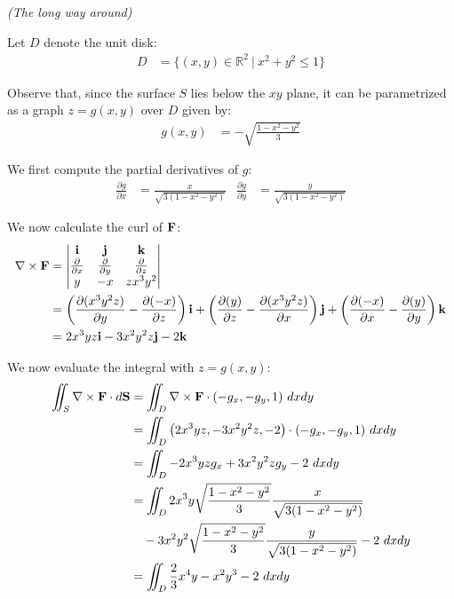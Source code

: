 \begin{solution}
    \textit{(The long way around)}

    Let \(D\) denote the unit disk:
    \begin{align}
        D &= \{(x, y) \in \mathbb{R}^2 \ | \ x^2 + y^2 \leq 1\}
    \end{align}
    
    Observe that, since the surface \(S\) lies below the \(xy\) plane, it can be parametrized as a graph \(z = g(x, y)\) over \(D\) given by:
    \begin{align}
        g(x, y) &= - \sqrt{\frac{1 - x^2 - y^2}{3}}
    \end{align}

    We first compute the partial derivatives of \(g\):
    \begin{align*}
        \frac{\partial g}{\partial x} &= \frac{x}{\sqrt{3(1 - x^2 - y^2)}} & \frac{\partial g}{\partial y} &= \frac{y}{\sqrt{3(1 - x^2 - y^2)}}
    \end{align*}

    We now calculate the curl of \(\vb{F}\):
    \begin{align*}
        \nabla \times \vb{F} &= 
        \begin{vmatrix}
            \vb{i} & \vb{j} & \vb{k} \\
            \frac{\partial}{\partial x} & \frac{\partial}{\partial y} & \frac{\partial}{\partial z} \\
            y & -x & zx^3y^2
        \end{vmatrix} \\
        &= \left(\frac{\partial (x^3y^2z)}{\partial y} - \frac{\partial (-x)}{\partial z}\right)\vb{i} + \left(\frac{\partial (y)}{\partial z} - \frac{\partial (x^3y^2z)}{\partial x}\right)\vb{j} + \left(\frac{\partial (-x)}{\partial x} - \frac{\partial (y)}{\partial y}\right)\vb{k} \\
        &= 2x^3yz\vb{i} - 3x^2y^2z\vb{j} -2\vb{k}
    \end{align*}

    We now evaluate the integral with \(z = g(x, y)\):
    \begin{align*}
        \iint_S \nabla \times \vb{F} \cdot d\vb{S} &= \iint_D \nabla \times \vb{F} \cdot (-g_x, -g_y, 1) \ dxdy \\
        &= \iint_D \left(2x^3yz, - 3x^2y^2z, -2\right) \cdot (-g_x, -g_y, 1) \ dxdy \\
        &= \iint_D -2x^3y z g_x + 3x^2y^2 z g_y -2 \ dxdy \\
        &= \iint_D 2x^3y \sqrt{\frac{1 - x^2 - y^2}{3}} \frac{x}{\sqrt{3(1 - x^2 - y^2)}} \\
        &\quad - 3x^2y^2 \sqrt{\frac{1 - x^2 - y^2}{3}} \frac{y}{\sqrt{3(1 - x^2 - y^2)}} -2 \ dxdy \\
        &= \iint_D \frac{2}{3}x^4y - x^2y^3 - 2 \ dxdy
    \end{align*}
    

\end{solution}
